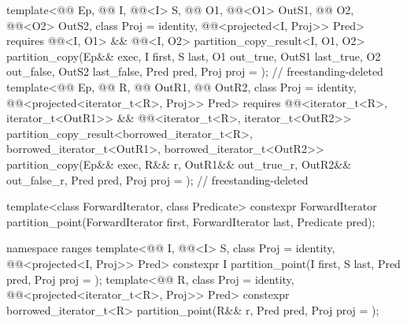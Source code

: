 \begin{codeblock}
{{    template<@@ Ep, @@ I, @@<I> S,
             @@ O1, @@<O1> OutS1,
             @@ O2, @@<O2> OutS2,
             class Proj = identity, @@<projected<I, Proj>> Pred>
      requires @@<I, O1> && @@<I, O2>
      partition_copy_result<I, O1, O2>
        partition_copy(Ep&& exec, I first, S last, O1 out_true, OutS1 last_true,
                       O2 out_false, OutS2 last_false, Pred pred,
                       Proj proj = {});                         // freestanding-deleted
    template<@@ Ep, @@ R,
             @@ OutR1, @@ OutR2,
             class Proj = identity,
             @@<projected<iterator_t<R>, Proj>> Pred>
      requires @@<iterator_t<R>, iterator_t<OutR1>> &&
               @@<iterator_t<R>, iterator_t<OutR2>>
      partition_copy_result<borrowed_iterator_t<R>, borrowed_iterator_t<OutR1>,
                            borrowed_iterator_t<OutR2>>
        partition_copy(Ep&& exec, R&& r, OutR1&& out_true_r, OutR2&& out_false_r, Pred pred,
                       Proj proj = {});                         // freestanding-deleted
  }

  template<class ForwardIterator, class Predicate>
    constexpr ForwardIterator
      partition_point(ForwardIterator first, ForwardIterator last,
                      Predicate pred);

  namespace ranges {
    template<@@ I, @@<I> S, class Proj = identity,
             @@<projected<I, Proj>> Pred>
      constexpr I partition_point(I first, S last, Pred pred, Proj proj = {});
    template<@@ R, class Proj = identity,
             @@<projected<iterator_t<R>, Proj>> Pred>
      constexpr borrowed_iterator_t<R>
        partition_point(R&& r, Pred pred, Proj proj = {});
  }

}
\end{codeblock}
